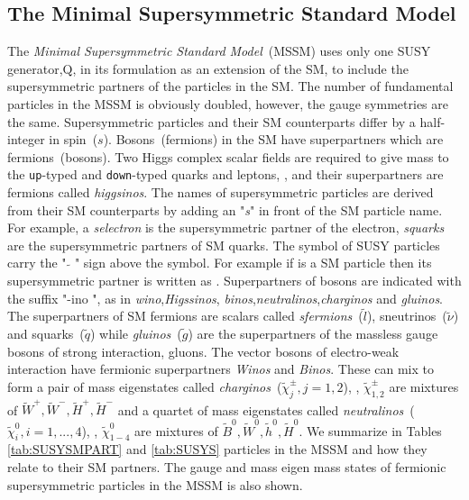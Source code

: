 \subsection{The Minimal Supersymmetric Standard Model}
The \textit{Minimal Supersymmetric Standard Model}~(MSSM) uses only one SUSY generator,$\mathrm{Q}$, in its formulation as an extension of the SM, to include the supersymmetric partners of the particles in the SM. The number of fundamental particles in the MSSM is obviously doubled, however, the gauge symmetries are the same. Supersymmetric particles and their SM counterparts differ by a half-integer in spin~($s$). Bosons~(fermions) in the SM have superpartners which are fermions~(bosons).
\newline
Two Higgs complex scalar fields are required to give mass to the \texttt{up}-typed and \texttt{down}-typed quarks and leptons, \cite{MSSM,SUSYM}, and their superpartners are fermions called \textit{higgsinos}.
\newline
The names of supersymmetric particles are derived from their SM counterparts by adding an "\textit{s}" in front of the SM particle name. For example, a \textit{selectron} is the supersymmetric partner of the electron, \textit{squarks} are the supersymmetric partners of SM quarks. The symbol of SUSY particles carry the " $\tilde{}$ " sign above the symbol. For example if \Pquark is a SM particle then  its supersymmetric partner is written as \Psquark. 
Superpartners of bosons are indicated with the suffix "-ino ", as in \textit{wino},\textit{Higssinos}, \textit{binos},\textit{neutralinos},\textit{charginos} and \textit{gluinos}.
\newline
The superpartners of SM fermions are scalars called \textit{sfermions}~($\tilde{l}$), sneutrinos~($\tilde{\nu}$) and squarks~($\tilde{q}$) while \textit{gluinos}~($\tilde{g}$) are the superpartners of the massless gauge bosons of strong interaction, gluons. The vector bosons of electro-weak interaction have fermionic superpartners  \textit{Winos} and \textit{Binos}. These can mix to form a pair of mass eigenstates called \textit{charginos}~($\tilde{\chi}^{\pm}_{j}, j=1,2$), \ie,
$\tilde{\chi}^{\pm}_{1,2}$ are mixtures of $\tilde{W}^{+}, \tilde{W}^{-}, \tilde{H}^{+}, \tilde{H}^{-} $ and a quartet of mass  eigenstates called \textit{neutralinos}~($\tilde{\chi}^{0}_{i}, i=1,...,4$), \ie, $\tilde{\chi}^{0}_{1-4}$ are mixtures of $\tilde{B}^{0}, \tilde{W}^{0}, \tilde{h}^{0}, \tilde{H}^{0} $.
We summarize in Tables \ref{tab:SUSYSMPART} and \ref{tab:SUSYS} particles in the MSSM and how they relate to their SM partners. The gauge and mass eigen mass states of fermionic supersymmetric particles in the MSSM is also shown.

